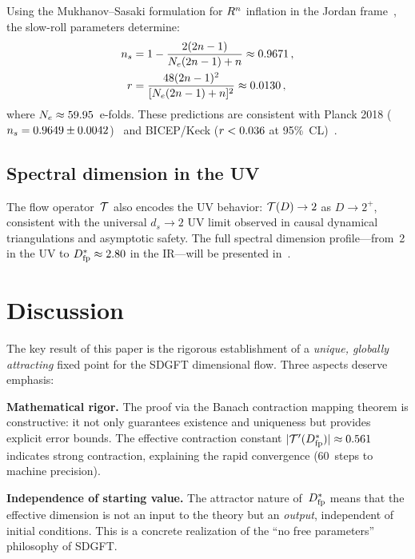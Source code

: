 \documentclass[amsmath,amssymb,aps,prd,twocolumn,superscriptaddress,nofootinbib]{revtex4-2}
\begin{document}
Using the Mukhanov--Sasaki formulation for $R^n$ inflation in
the Jordan frame~\cite{Hwang2001,Goldstein_Paper17}, the slow-roll
parameters determine:
\begin{align}
  n_s &= 1 - \frac{2(2n-1)}{N_e(2n-1)+n}
       \approx 0.9671\,,
       \label{eq:n_s} \\
  r &= \frac{48(2n-1)^2}{[N_e(2n-1)+n]^2}
       \approx 0.0130\,,
       \label{eq:r}
\end{align}
where $N_e \approx 59.95$~e-folds.  These predictions are
consistent with Planck 2018
($n_s = 0.9649 \pm 0.0042$)~\cite{Planck2018_inflation} and
BICEP/Keck ($r < 0.036$ at 95\%~CL)~\cite{BICEP2021}.

\subsection{Spectral dimension in the UV}

The flow operator~$\mathcal{T}$ also encodes the UV behavior:
$\mathcal{T}(D) \to 2$ as $D \to 2^+$, consistent with the universal
$d_s \to 2$ UV limit observed in causal dynamical triangulations
and asymptotic safety.  The full spectral dimension
profile---from~2 in the UV to $D^{*}_{\mathrm{fp}} \approx 2.80$ in the
IR---will be presented in~\cite{Goldstein_Paper16}.

\section{Discussion}
\label{sec:discussion}

The key result of this paper is the rigorous establishment of a
\emph{unique, globally attracting} fixed point for the SDGFT
dimensional flow.  Three aspects deserve emphasis:

\textbf{Mathematical rigor.}\quad
The proof via the Banach contraction mapping theorem is
constructive: it not only guarantees existence and uniqueness but
provides explicit error bounds.  The effective contraction constant
$\lvert\mathcal{T}'(D^{*}_{\mathrm{fp}})\rvert \approx 0.561$ indicates strong
contraction, explaining the rapid convergence (60~steps to machine
precision).

\textbf{Independence of starting value.}\quad
The attractor nature of~$D^{*}_{\mathrm{fp}}$ means that the effective
dimension is not an input to the theory but an \emph{output},
independent of initial conditions.  This is a concrete realization
of the ``no free parameters'' philosophy of SDGFT.
\end{document}
